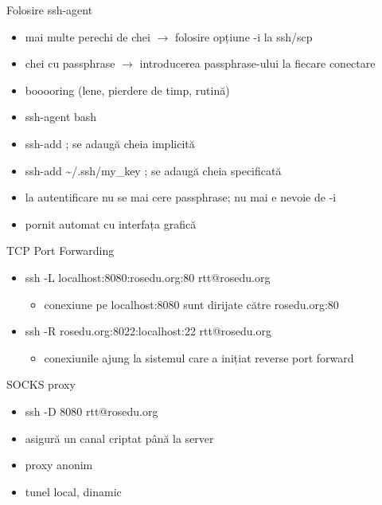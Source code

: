 \documentclass{beamer}
\begin{document}
\begin{frame}{Folosire ssh-agent}
  \begin{itemize}
    \item mai multe perechi de chei $\rightarrow$ folosire opțiune -i la ssh/scp
    \item chei cu passphrase $\rightarrow$ introducerea passphrase-ului la fiecare conectare
    \item booooring (lene, pierdere de timp, rutină)
	\item ssh-agent bash
    \item ssh-add    ; se adaugă cheia implicită
    \item ssh-add \~{}/.ssh/my\_key    ; se adaugă cheia specificată
    \item la autentificare nu se mai cere passphrase; nu mai e nevoie de -i
    \item pornit automat cu interfața grafică
  \end{itemize}
\end{frame}

\begin{frame}{TCP Port Forwarding}
  \begin{itemize}
    \item ssh -L localhost:8080:rosedu.org:80 rtt@rosedu.org
      \begin{itemize}
        \item conexiune pe localhost:8080 sunt dirijate către
rosedu.org:80
      \end{itemize}
    \item ssh -R rosedu.org:8022:localhost:22 rtt@rosedu.org 
       \begin{itemize}
         \item conexiunile ajung la sistemul care a inițiat reverse port
		 forward
       \end{itemize}
  \end{itemize}
\end{frame}

\begin{frame}{SOCKS proxy}
  \begin{itemize}
  	\item ssh -D 8080 rtt@rosedu.org
	\item asigură un canal criptat până la server
	\item proxy anonim
	\item tunel local, dinamic
  \end{itemize}
\end{frame}
\end{document}
